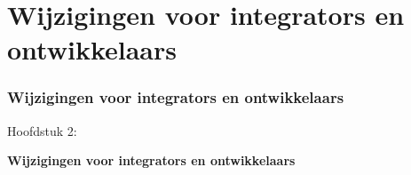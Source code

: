 %

\section{Wijzigingen voor integrators en ontwikkelaars}
\begin{frame}[fragile]
	\frametitle{Wijzigingen voor integrators en ontwikkelaars}

	\begin{center}\huge{Hoofdstuk 2:}\end{center}
	\begin{center}\huge{\color{typo3darkgrey}\textbf{Wijzigingen voor integrators en ontwikkelaars}}\end{center}

\end{frame}

